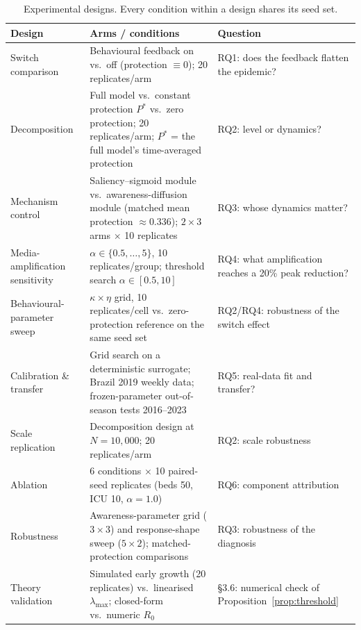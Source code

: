 \documentclass[]{interact}
\begin{document}
\begin{table}[htb]
\centering
\small
\begin{tabular}{p{3.4cm}p{5.2cm}p{4.6cm}}
\hline
\textbf{Design} & \textbf{Arms / conditions} & \textbf{Question} \\
\hline
Switch comparison & Behavioural feedback on vs.\ off (protection $\equiv 0$); 20 replicates/arm & RQ1: does the feedback flatten the epidemic? \\
Decomposition & Full model vs.\ constant protection $P^{*}$ vs.\ zero protection; 20 replicates/arm; $P^{*}$ = the full model's time-averaged protection & RQ2: level or dynamics? \\
Mechanism control & Saliency--sigmoid module vs.\ awareness-diffusion module (matched mean protection $\approx 0.336$); $2\times3$ arms $\times$ 10 replicates & RQ3: whose dynamics matter? \\
Media-amplification sensitivity & $\alpha \in \{0.5,\dots,5\}$, 10 replicates/group; threshold search $\alpha \in [0.5,10]$ & RQ4: what amplification reaches a 20\% peak reduction? \\
Behavioural-parameter sweep & $\kappa \times \eta$ grid, 10 replicates/cell vs.\ zero-protection reference on the same seed set & RQ2/RQ4: robustness of the switch effect \\
Calibration \& transfer & Grid search on a deterministic surrogate; Brazil 2019 weekly data; frozen-parameter out-of-season tests 2016--2023 & RQ5: real-data fit and transfer? \\
Scale replication & Decomposition design at $N{=}10{,}000$; 20 replicates/arm & RQ2: scale robustness \\
Ablation & 6 conditions $\times$ 10 paired-seed replicates (beds 50, ICU 10, $\alpha{=}1.0$) & RQ6: component attribution \\
Robustness & Awareness-parameter grid ($3\times3$) and response-shape sweep ($5\times2$); matched-protection comparisons & RQ3: robustness of the diagnosis \\
Theory validation & Simulated early growth (20 replicates) vs.\ linearised $\lambda_{\max}$; closed-form vs.\ numeric $R_0$ & \S3.6: numerical check of Proposition~\ref{prop:threshold} \\
\hline
\end{tabular}
\caption{Experimental designs. Every condition within a design shares its seed set.}
\label{tab:designs}
\end{table}
\end{document}
